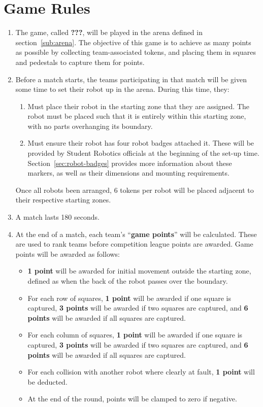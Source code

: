 \section {Game Rules}
\label{game-rules}

\begin{enumerate}
\item The game, called \textbf{???}, will be played in the arena defined in section~\ref{sub:arena}.
      The objective of this game is to achieve as many points as possible by collecting team-associated tokens,
       and placing them in squares and pedestals to capture them for points.

\item Before a match starts, the teams participating in that match will be given some time to set their robot up in the arena.
      During this time, they:
\begin{enumerate}
  \item Must place their robot in the starting zone that they are assigned.
        The robot must be placed such that it is entirely within this starting zone, with no parts overhanging its boundary.

  \item Must ensure their robot has four robot badges attached it.
        These will be provided by Student Robotics officials at the beginning of the set-up time.
        Section~\ref{sec:robot-badges} provides more information about these markers, as well as their dimensions and mounting requirements.
\end{enumerate}
      Once all robots been arranged, 6 tokens per robot will be placed adjacent to their respective starting zones.

\item A match lasts 180 seconds.

\item At the end of a match, each team's ``\textbf{game points}'' will be calculated.
      These are used to rank teams before competition league points are awarded.
      Game points will be awarded as follows:
\begin{itemize}
  \item \textbf{1 point} will be awarded for initial movement outside the starting zone, defined as when the back of the robot passes over the boundary.
  \item For each row of squares, \textbf{1 point} will be awarded if one square is captured, \textbf{3 points} will be awarded if two squares are captured, and \textbf{6 points} will be awarded if all squares are captured.
  \item For each column of squares, \textbf{1 point} will be awarded if one square is captured, \textbf{3 points} will be awarded if two squares are captured, and \textbf{6 points} will be awarded if all squares are captured.
  \item For each collision with another robot where clearly at fault, \textbf{1 point} will be deducted.
  \item At the end of the round, points will be clamped to zero if negative.
\end{itemize}


\end{enumerate}
